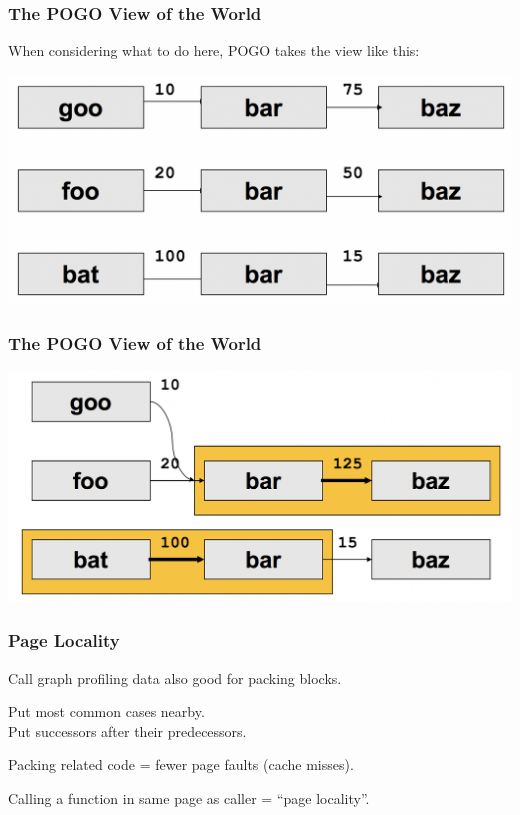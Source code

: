 \begin{frame}
\frametitle{The POGO View of the World}

When considering what to do here, POGO takes the view like this:

\begin{center}
	\includegraphics[width=\textwidth]{images/callpaths3.png}
\end{center}

\end{frame}



\begin{frame}
\frametitle{The POGO View of the World}

\begin{center}
	\includegraphics[width=\textwidth]{images/callpaths4.png}
\end{center}

\end{frame}




\begin{frame}
\frametitle{Page Locality}



Call graph profiling data also good for packing blocks.

Put most common cases nearby.\\
Put successors after their predecessors.

Packing related code = fewer page faults (cache misses).

Calling a function in same page as caller =  ``page locality''.


\end{frame}




